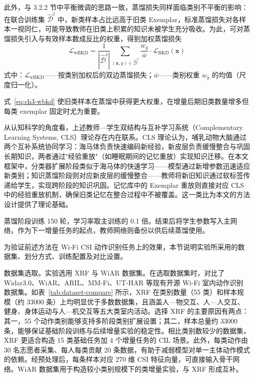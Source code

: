 此外，与 3.2.2 节中平衡微调的思路一致，蒸馏损失同样面临类别不平衡的影响：在联合训练集 $\hat{\mathcal{D}}^t$ 中，新类样本占比远高于旧类 Exemplar，标准蒸馏损失对各样本一视同仁，可能导致教师在旧类上积累的知识未被学生充分吸收。为此，可对蒸馏损失引入与有效样本数成反比的权重，得到加权蒸馏损失
\begin{equation}\label{eq:ch3-wbkd}
\mathcal{L}_{\mathrm{wBKD}} = \frac{1}{|\hat{\mathcal{D}}^t|} \sum_{(\mathbf{x},y) \in \hat{\mathcal{D}}^t} \frac{w_y}{\bar{w}} \cdot \mathcal{L}_{\mathrm{BKD}}(\mathbf{x})
\end{equation}
\noindent 式中：$\mathcal{L}_{\mathrm{wBKD}}$——按类别加权后的双边蒸馏损失；$\bar{w}$——类别权重 $w_y$ 的均值（尺度归一化）。

式~\eqref{eq:ch3-wbkd} 使旧类样本在蒸馏中获得更大权重，在增量后期旧类数量增多但每类 exemplar 固定时尤为重要。

从认知科学的角度看，上述教师—学生双结构与互补学习系统（Complementary Learning Systems, CLS）理论\cite{mcclelland1995cls,pham2021dualnet}存在内在联系。CLS 理论认为，哺乳动物大脑通过两个互补系统协同学习：海马体负责快速编码新经验，新皮层负责缓慢整合与巩固长期知识，两者通过"经验重放"（如睡眠期间的记忆重放）实现知识迁移。在本文框架中，分类器扩展阶段类似于海马体的快速学习——模型通过新增参数迅速适应新类别；知识蒸馏阶段则对应新皮层的缓慢整合——教师将新旧知识通过软标签传递给学生，实现跨阶段的知识巩固。记忆库中的 Exemplar 重放则直接对应 CLS 中的经验重放机制，确保旧类记忆在整合过程中不被覆盖。这一类比为本文的方法设计提供了理论基础。

蒸馏阶段训练 150 轮，学习率取主训练的 0.1 倍。结束后将学生参数写入主网络，作为下一增量任务的起点，教师网络则备份以供后续蒸馏使用。


为验证前述方法在 Wi-Fi CSI 动作识别任务上的效果，本节说明实验所采用的数据集、划分方式、训练配置及对比设置。


数据集选取。实验选用 XRF 与 WiAR 数据集。在选取数据集时，对比了 Widar3.0\cite{zhang2019widar3}、WiAR\cite{guo2019wiar}、ARIL\cite{wang2019jointharwifi}、MM-Fi\cite{yang2023mmfi}、UT-HAR\cite{yousefi2017wifiharsurvey} 等现有开源 Wi-Fi 室内动作识别数据集。如表~\ref{tab:dataset-compare} 所示，XRF 在类别数量（55 类）和样本规模（约 33000 条）上均明显优于多数数据集，且涵盖人—物交互、人—人交互、健身、身体运动与人—机交互等五大类室内活动。选择 XRF 的主要原因有两点：其一，55 个动作类别能够支持多阶段类别扩展设置；其二，样本总量约 33000 条，能够保证基础阶段训练与后续增量实验的稳定性。相比类别数较少的数据集，XRF 更适合构造 15 类基础任务加 4 个增量任务的 CIL 场景。此外，每类动作由 30 名志愿者采集、每人每类贡献 20 条数据，有助于减弱模型对单一主体动作模式的依赖。经预处理后，每条样本对应 270 维 CSI 特征向量，可直接输入骨干网络。WiAR 数据集用于构造较小类别规模下的类增量实验，与 XRF 形成互补。

